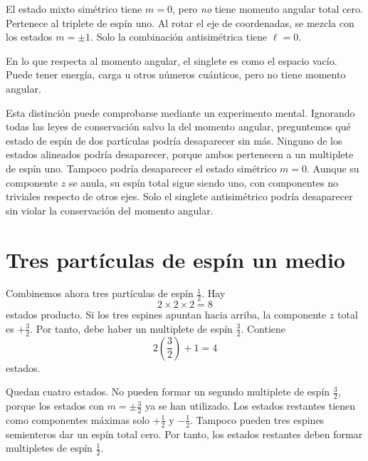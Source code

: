 El estado mixto simétrico tiene \(m=0\), pero \emph{no} tiene momento angular total cero. Pertenece al triplete de espín uno. Al rotar el eje de coordenadas, se mezcla con los estados \(m=\pm1\). Solo la combinación antisimétrica tiene \(\ell=0\).

En lo que respecta al momento angular, el singlete es como el espacio vacío. Puede tener energía, carga u otros números cuánticos, pero no tiene momento angular.

Esta distinción puede comprobarse mediante un experimento mental. Ignorando todas las leyes de conservación salvo la del momento angular, preguntemos qué estado de espín de dos partículas podría desaparecer sin más. Ninguno de los estados alineados podría desaparecer, porque ambos pertenecen a un multiplete de espín uno. Tampoco podría desaparecer el estado simétrico \(m=0\). Aunque su componente \(z\) se anula, su espín total sigue siendo uno, con componentes no triviales respecto de otros ejes. Solo el singlete antisimétrico podría desaparecer sin violar la conservación del momento angular.

\begin{classroomqa}
\end{classroomqa}

\section{Tres partículas de espín un medio}

Combinemos ahora tres partículas de espín \(\tfrac12\). Hay
\begin{equation}
2\times2\times2=8
\end{equation}
estados producto. Si los tres espines apuntan hacia arriba, la componente \(z\) total es \(+\tfrac32\). Por tanto, debe haber un multiplete de espín \(\tfrac32\). Contiene
\begin{equation}
2\left(\frac32\right)+1=4
\end{equation}
estados.

Quedan cuatro estados. No pueden formar un segundo multiplete de espín \(\tfrac32\), porque los estados con \(m=\pm\tfrac32\) ya se han utilizado. Los estados restantes tienen como componentes máximas solo \(+\tfrac12\) y \(-\tfrac12\). Tampoco pueden tres espines semienteros dar un espín total cero. Por tanto, los estados restantes deben formar multipletes de espín \(\tfrac12\).

